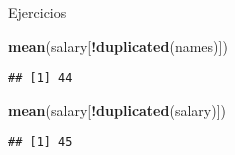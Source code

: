 \documentclass[ignorenonframetext,]{beamer}
\newenvironment{Shaded}{\begin{snugshade}}{\end{snugshade}}
\newcommand{\KeywordTok}[1]{\textcolor[rgb]{0.13,0.29,0.53}{\textbf{#1}}}
\newcommand{\OperatorTok}[1]{\textcolor[rgb]{0.81,0.36,0.00}{\textbf{#1}}}
\newcommand{\NormalTok}[1]{#1}
\begin{document}
\begin{frame}[fragile]{Ejercicios}

\begin{Shaded}
\begin{Highlighting}[]
\KeywordTok{mean}\NormalTok{(salary[}\OperatorTok{!}\KeywordTok{duplicated}\NormalTok{(names)])}
\end{Highlighting}
\end{Shaded}
\pause
\begin{verbatim}
## [1] 44
\end{verbatim}

\begin{Shaded}
\begin{Highlighting}[]
\KeywordTok{mean}\NormalTok{(salary[}\OperatorTok{!}\KeywordTok{duplicated}\NormalTok{(salary)])}
\end{Highlighting}
\end{Shaded}
\pause
\begin{verbatim}
## [1] 45
\end{verbatim}

\end{frame}
\end{document}
